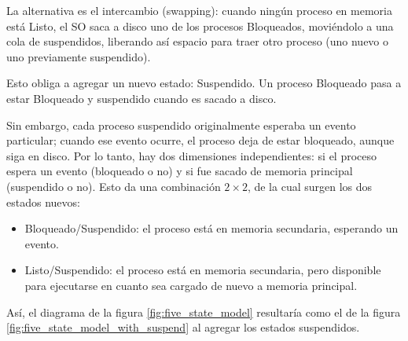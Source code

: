 La alternativa es el intercambio (swapping): cuando ningún proceso en memoria está Listo, el SO saca a disco uno de los procesos Bloqueados, moviéndolo a una cola de suspendidos, liberando así espacio para traer otro proceso (uno nuevo o uno previamente suspendido).

Esto obliga a agregar un nuevo estado: Suspendido. Un proceso Bloqueado pasa a estar Bloqueado y suspendido cuando es sacado a disco.

Sin embargo, cada proceso suspendido originalmente esperaba un evento particular; cuando ese evento ocurre, el proceso deja de estar bloqueado, aunque siga en disco. Por lo tanto, hay dos dimensiones independientes: si el proceso espera un evento (bloqueado o no) y si fue sacado de memoria principal (suspendido o no). Esto da una combinación \(2\times2\), de la cual surgen los dos estados nuevos:
\begin{itemize}
  \item Bloqueado/Suspendido: el proceso está en memoria secundaria, esperando un evento.
  \item Listo/Suspendido: el proceso está en memoria secundaria, pero disponible para ejecutarse en cuanto sea cargado de nuevo a memoria principal.
\end{itemize}

Así, el diagrama de la figura \ref{fig:five_state_model} resultaría como el de la figura \ref{fig:five_state_model_with_suspend} al agregar los estados suspendidos.

